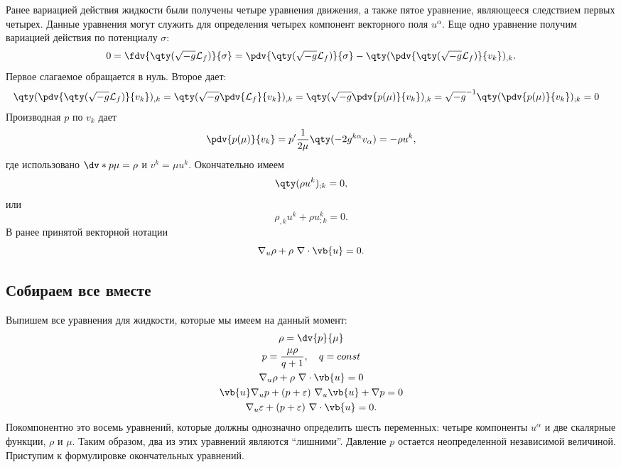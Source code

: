 \documentclass[\docroot/reports/draft/report.tex]{subfiles}
\begin{document}
    Ранее вариацией действия жидкости были получены четыре уравнения движения, а также пятое уравнение, являющееся следствием первых четырех. Данные уравнения могут служить для определения четырех компонент векторного поля $u^\alpha$. Еще одно уравнение получим вариацией действия по потенциалу $\sigma$:
    \begin{equation*}
        0 = \fdv{\qty(\sqrt{-g} \mathcal{L}_f)}{\sigma} =
            \pdv{\qty(\sqrt{-g} \mathcal{L}_f)}{\sigma} -
            \qty(\pdv{\qty(\sqrt{-g} \mathcal{L}_f)}{v_k})_{,k} .
    \end{equation*}
    Первое слагаемое обращается в нуль. Второе дает:
    \begin{equation*}\begin{aligned}
        \qty(\pdv{\qty(\sqrt{-g} \mathcal{L}_f)}{v_k})_{,k} &=
        \qty(\sqrt{-g} \pdv{\mathcal{L}_f}{v_k})_{,k} =
        \qty(\sqrt{-g} \pdv{p(\mu)}{v_k})_{,k} =
        \sqrt{-g}^{-1} \qty(\pdv{p(\mu)}{v_k})_{;k} = 0
    \end{aligned}\end{equation*}
    Производная $p$ по $v_k$ дает
    \begin{equation*}
        \pdv{p(\mu)}{v_k} = p' \frac{1}{2 \mu} \qty(- 2 g^{k\alpha} v_\alpha) = - \rho u^k ,
    \end{equation*}
    где использовано $\dv*{p}{\mu} = \rho$ и $v^k = \mu u^k$. Окончательно имеем
    \begin{equation*}
        \qty(\rho u^k)_{;k} = 0 ,
    \end{equation*}
    или
    \begin{equation*}
        \rho_{,k} u^k + \rho u^k_{;k} = 0 .
    \end{equation*}
    В ранее принятой векторной нотации
    \begin{equation}
        \nabla_u \rho + \rho\ \nabla \cdot \vb{u} = 0 .
    \end{equation}

\subsection{Собираем все вместе}

    Выпишем все уравнения для жидкости, которые мы имеем на данный момент:
    \begin{gather}
        \rho = \dv{p}{\mu} \\
        p = \frac{\mu\rho}{q + 1} , \quad q = const \\
        \nabla_u \rho + \rho\ \nabla \cdot \vb{u} = 0 \\
        \vb{u} \nabla_u p + (p + \varepsilon)\ \nabla_u \vb{u} + \nabla p = 0 \\
        \nabla_u \varepsilon + (p + \varepsilon)\ \nabla \cdot \vb{u} = 0 .
    \end{gather}
    Покомпонентно это восемь уравнений, которые должны однозначно определить шесть переменных: четыре компоненты $u^\alpha$ и две скалярные функции, $\rho$ и $\mu$. Таким образом, два из этих уравнений являются \enquote{лишними}. Давление $p$ остается неопределенной независимой величиной. Приступим к формулировке окончательных уравнений.
\end{document}
